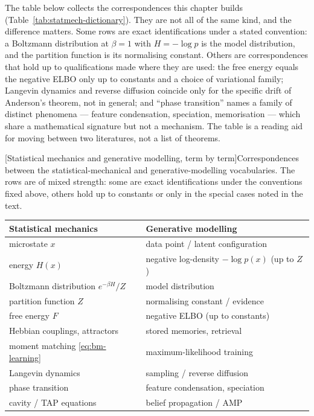 The table below collects the correspondences this chapter builds
(Table~\ref{tab:statmech-dictionary}). They are not all of the same kind, and
the difference matters. Some rows are exact identifications under a stated
convention: a Boltzmann distribution at $\beta = 1$ with $H = -\log p$ is the
model distribution, and the partition function is its normalising constant.
Others are correspondences that hold up to qualifications made where they are
used: the free energy equals the negative ELBO only up to constants and a
choice of variational family; Langevin dynamics and reverse diffusion coincide
only for the specific drift of Anderson's theorem, not in general; and
``phase transition'' names a family of distinct phenomena --- feature
condensation, speciation, memorisation --- which share a mathematical signature
but not a mechanism. The table is a reading aid for moving between two
literatures, not a list of theorems.

\begin{center}
\begin{minipage}{\linewidth}\centering
{}[Statistical mechanics and generative modelling, term by term]{Correspondences between the statistical-mechanical and generative-modelling vocabularies. The rows are of mixed strength: some are exact identifications under the conventions fixed above, others hold up to constants or only in the special cases noted in the text.}
\label{tab:statmech-dictionary}
\begin{tabular}{ll}
\toprule
\textbf{Statistical mechanics} & \textbf{Generative modelling} \\
\midrule
microstate $x$ & data point / latent configuration \\
energy $H(x)$ & negative log-density $-\log p(x)$ (up to $Z$) \\
Boltzmann distribution $e^{-\beta H}/Z$ & model distribution \\
partition function $Z$ & normalising constant / evidence \\
free energy $F$ & negative ELBO (up to constants) \\
Hebbian couplings, attractors & stored memories, retrieval \\
moment matching \eqref{eq:bm-learning} & maximum-likelihood training \\
Langevin dynamics & sampling / reverse diffusion \\
phase transition & feature condensation, speciation \\
cavity / TAP equations & belief propagation / AMP \\
\bottomrule
\end{tabular}
\end{minipage}
\end{center}
